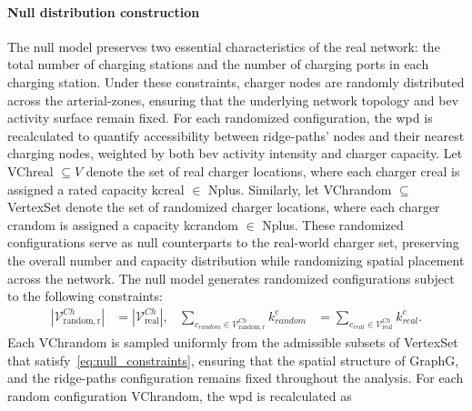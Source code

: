 \paragraph{Null distribution construction}
The null model preserves two essential characteristics of the real network: the total number of charging stations and the number of charging ports in each charging station. Under these constraints, charger nodes are randomly distributed across the arterial-zones, ensuring that the underlying network topology and \gls{bev} activity surface remain fixed.
For each randomized configuration, the \gls{wpd} is recalculated to quantify accessibility between ridge-paths' nodes and their nearest charging nodes, weighted by both \gls{bev} activity intensity and charger capacity. Let \gls{VChreal} $\subseteq V$ denote the set of real charger locations, where each charger \gls{creal} is assigned a rated capacity \gls{kcreal} $\in$ \gls{Nplus}. Similarly, let \gls{VChrandom} $\subseteq$ \gls{VertexSet} denote the set of randomized charger locations, where each charger \gls{crandom} is assigned a capacity \gls{kcrandom} $\in $ \gls{Nplus}. These randomized configurations serve as null counterparts to the real-world charger set, preserving the overall number and capacity distribution while randomizing spatial placement across the network.
The null model generates randomized configurations subject to the following constraints:
\begin{align}
|\mathcal{V}^{Ch}_{\mathrm{random,r}}| &= |\mathcal{V}^{Ch}_{\mathrm{real}}|, 
&
\sum_{c_{random} \in \mathcal{V}^{Ch}_{\mathrm{random,r}}} k^c_{random} 
&= 
\sum_{c_{real} \in \mathcal{V}^{Ch}_{\mathrm{real}}} k^c_{real}.
\label{eq:null_constraints}
\end{align}
Each \gls{VChrandom} is sampled uniformly from the admissible subsets of \gls{VertexSet} that satisfy~\eqref{eq:null_constraints}, ensuring that the spatial structure of \gls{GraphG}, and the ridge-paths configuration remains fixed throughout the analysis. For each random configuration \gls{VChrandom}, the \gls{wpd} is recalculated as

